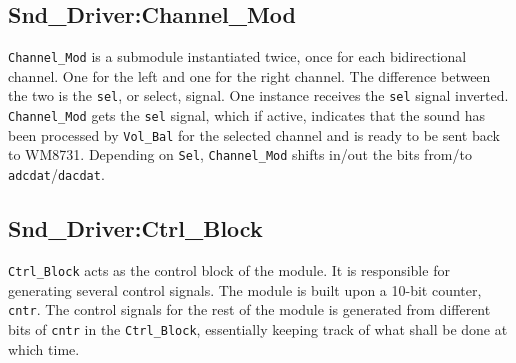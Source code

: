 \subsection{Snd\_Driver:Channel\_Mod}\label{sec:channelmod}

\verb?Channel_Mod? is a submodule instantiated twice, once for each bidirectional channel. One for the left and one for the right channel. The difference between the two is the \verb?sel?, or select, signal. One instance receives the \verb?sel? signal inverted. \verb?Channel_Mod? gets the \verb?sel? signal, which if active, indicates that the sound has been processed by \verb?Vol_Bal? for the selected channel and is ready to be sent back to WM8731. Depending on \verb?Sel?, \verb?Channel_Mod? shifts in/out the bits from/to \verb?adcdat?/\verb?dacdat?.

\subsection{Snd\_Driver:Ctrl\_Block}\label{sec:ctrlblock}

\verb?Ctrl_Block? acts as the control block of the module. It is responsible for generating several control signals. The module is built upon a 10-bit counter, \verb?cntr?. The control signals for the rest of the module is generated from different bits of \verb?cntr? in the \verb?Ctrl_Block?, essentially keeping track of what shall be done at which time.


